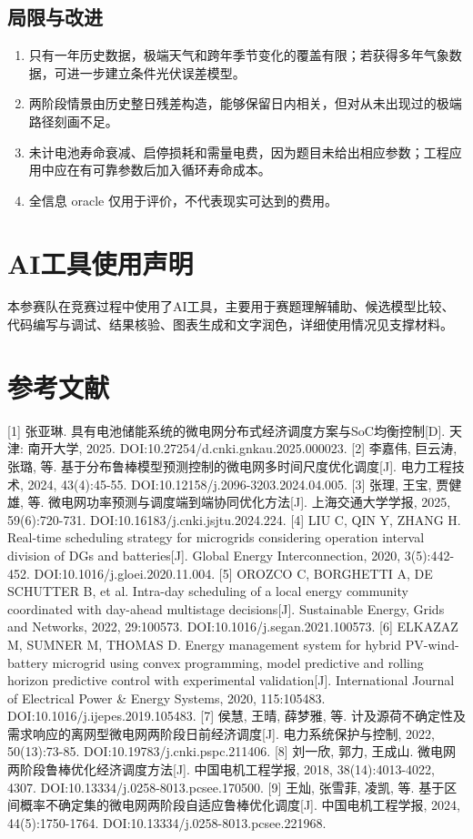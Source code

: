 \documentclass[12pt,a4paper]{ctexart}
\begin{document}
\subsection{局限与改进}
\begin{enumerate}[leftmargin=2.2em,itemsep=0.2em]
\item 只有一年历史数据，极端天气和跨年季节变化的覆盖有限；若获得多年气象数据，可进一步建立条件光伏误差模型。
\item 两阶段情景由历史整日残差构造，能够保留日内相关，但对从未出现过的极端路径刻画不足。
\item 未计电池寿命衰减、启停损耗和需量电费，因为题目未给出相应参数；工程应用中应在有可靠参数后加入循环寿命成本。
\item 全信息 oracle 仅用于评价，不代表现实可达到的费用。
\end{enumerate}
\section*{AI工具使用声明}
本参赛队在竞赛过程中使用了AI工具，主要用于赛题理解辅助、候选模型比较、代码编写与调试、结果核验、图表生成和文字润色，详细使用情况见支撑材料。\par
\section*{参考文献}
[1] 张亚琳. 具有电池储能系统的微电网分布式经济调度方案与SoC均衡控制[D]. 天津: 南开大学, 2025. DOI:10.27254/d.cnki.gnkau.2025.000023. [2] 李嘉伟, 巨云涛, 张璐, 等. 基于分布鲁棒模型预测控制的微电网多时间尺度优化调度[J]. 电力工程技术, 2024, 43(4):45-55. DOI:10.12158/j.2096-3203.2024.04.005. [3] 张理, 王宝, 贾健雄, 等. 微电网功率预测与调度端到端协同优化方法[J]. 上海交通大学学报, 2025, 59(6):720-731. DOI:10.16183/j.cnki.jsjtu.2024.224. [4] LIU C, QIN Y, ZHANG H. Real-time scheduling strategy for microgrids considering operation interval division of DGs and batteries[J]. Global Energy Interconnection, 2020, 3(5):442-452. DOI:10.1016/j.gloei.2020.11.004. [5] OROZCO C, BORGHETTI A, DE SCHUTTER B, et al. Intra-day scheduling of a local energy community coordinated with day-ahead multistage decisions[J]. Sustainable Energy, Grids and Networks, 2022, 29:100573. DOI:10.1016/j.segan.2021.100573. [6] ELKAZAZ M, SUMNER M, THOMAS D. Energy management system for hybrid PV-wind-battery microgrid using convex programming, model predictive and rolling horizon predictive control with experimental validation[J]. International Journal of Electrical Power \& Energy Systems, 2020, 115:105483. DOI:10.1016/j.ijepes.2019.105483. [7] 侯慧, 王晴, 薛梦雅, 等. 计及源荷不确定性及需求响应的离网型微电网两阶段日前经济调度[J]. 电力系统保护与控制, 2022, 50(13):73-85. DOI:10.19783/j.cnki.pspc.211406. [8] 刘一欣, 郭力, 王成山. 微电网两阶段鲁棒优化经济调度方法[J]. 中国电机工程学报, 2018, 38(14):4013-4022, 4307. DOI:10.13334/j.0258-8013.pcsee.170500. [9] 王灿, 张雪菲, 凌凯, 等. 基于区间概率不确定集的微电网两阶段自适应鲁棒优化调度[J]. 中国电机工程学报, 2024, 44(5):1750-1764. DOI:10.13334/j.0258-8013.pcsee.221968.\par
\clearpage
\appendix
\end{document}
